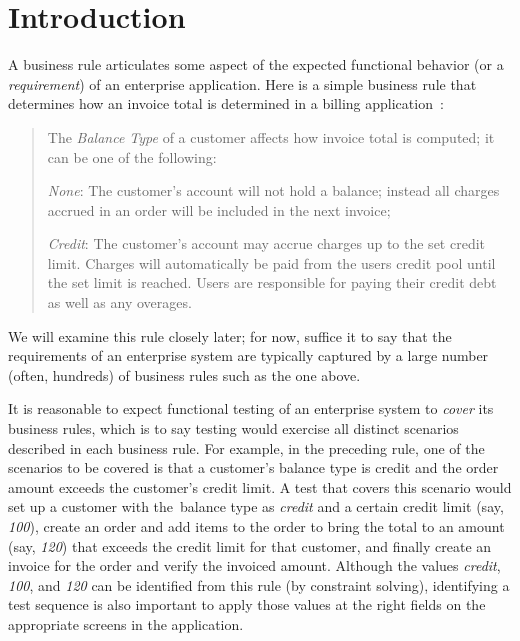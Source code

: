 \section{Introduction}

A business rule articulates some aspect of the expected functional behavior (or
a \textit{requirement}) of an enterprise application. Here is a simple business
rule that determines how an invoice total is determined in a billing
application~\cite{jbilling}:
%
\begin{quote}
{\small
	
The \textit{Balance Type} of a customer affects how invoice total is computed;
it can be one of the following:

\textit{None}: The customer's account will not hold a balance; instead all
charges accrued in an order will be included in the next invoice;
	
\textit{Credit}: The customer's account may accrue charges up to the set credit
limit.  Charges will automatically be paid from the users credit pool until the
set limit is reached.  Users are responsible for paying their credit debt as
well as any overages.

}
\end{quote}	
%
We will examine this rule closely later; for now, suffice it to say that the
requirements of an enterprise system are typically captured by a large number
(often, hundreds) of business rules such as the one above.

It is reasonable to expect functional testing of an enterprise system to
\textit{cover} its business rules, which is to say testing would exercise all
distinct scenarios described in each business rule.  For example, in the
preceding rule, one of the scenarios to be covered is that a customer's balance
type is credit and the order amount exceeds the customer's credit limit.  A test
that covers this scenario would set up a customer with the~balance type as
\textit{credit} and a certain credit limit (say, \textit{100}), create an order
and add items to the order to bring the total to an amount (say, \textit{120})
that exceeds the credit limit for that customer, and finally create an invoice
for the order and verify the invoiced amount.
Although the values
\textit{credit}, \textit{100}, and \textit{120} can be identified from this
rule (by constraint solving), identifying a test sequence is also important to
apply those values at the right fields on the appropriate
screens in the application.

